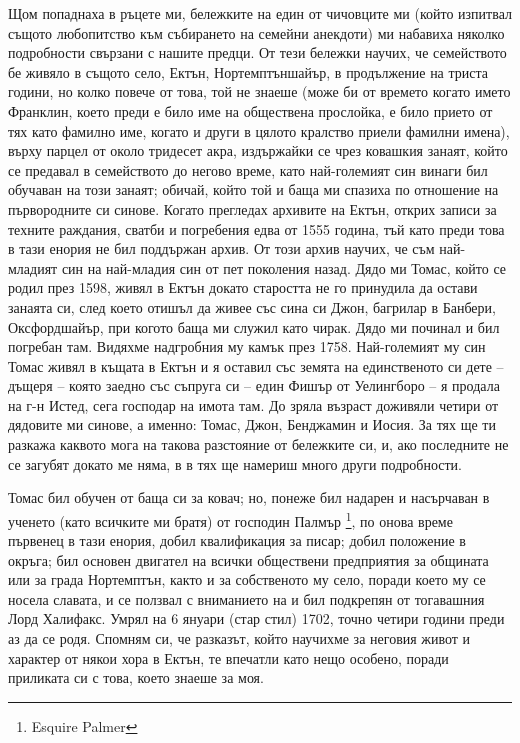 \documentclass[12pt]{book}
\begin{document}
Щом попаднаха в ръцете ми, бележките на един от чичовците ми (който изпитвал същото любопитство към събирането на семейни анекдоти) ми набавиха няколко подробности свързани с нашите предци. От тези бележки научих, че семейството бе живяло в същото село, Ектън, Нортемптъншайър, в продължение на триста години, но колко повече от това, той не знаеше (може би от времето когато името Франклин, което преди е било име на обществена прослойка, е било прието от тях като фамилно име, когато и други в цялото кралство приели фамилни имена), върху парцел от около тридесет акра, издържайки се чрез ковашкия занаят, който се предавал в семейството до негово време, като най-големият син винаги бил обучаван на този занаят; обичай, който той и баща ми спазиха по отношение на първородните си синове. Когато прегледах архивите на Ектън, открих записи за техните раждания, сватби и погребения едва от 1555 година, тъй като преди това в тази енория не бил поддържан архив. От този архив научих, че съм най-младият син на най-младия син от пет поколения назад. Дядо ми Томас, който се родил през 1598, живял в Ектън докато старостта не го принудила да остави занаята си, след което отишъл да живее със сина си Джон, багрилар в Банбери, Оксфордшайър, при когото баща ми служил като чирак. Дядо ми починал и бил погребан там. Видяхме надгробния му камък през 1758. Най-големият му син Томас живял в къщата в Ектън и я оставил със земята на единственото си дете – дъщеря – която заедно със съпруга си – един Фишър от Уелингборо – я продала на г-н Истед, сега господар на имота там. До зряла възраст доживяли четири от дядовите ми синове, а именно: Томас, Джон, Бенджамин и Иосия. За тях ще ти разкажа каквото мога на такова разстояние от бележките си, и, ако последните не се загубят докато ме няма, в в тях ще намериш много други подробности. 

Томас бил обучен от баща си за ковач; но, понеже бил надарен и насърчаван в ученето (като всичките ми братя) от господин Палмър \footnote{Esquire Palmer}, по онова време първенец в тази енория, добил квалификация за писар; добил положение в окръга; бил основен двигател на всички обществени предприятия за общината или за града Нортемптън, както и за собственото му село, поради което му се носела славата, и се ползвал с вниманието на и бил подкрепян от тогавашния Лорд Халифакс. Умрял на 6 януари (стар стил) 1702, точно четири години преди аз да се родя. Спомням си, че разказът, който научихме за неговия живот и характер от някои хора в Ектън, те впечатли като нещо особено, поради приликата си с това, което знаеше за моя. 
\end{document}
